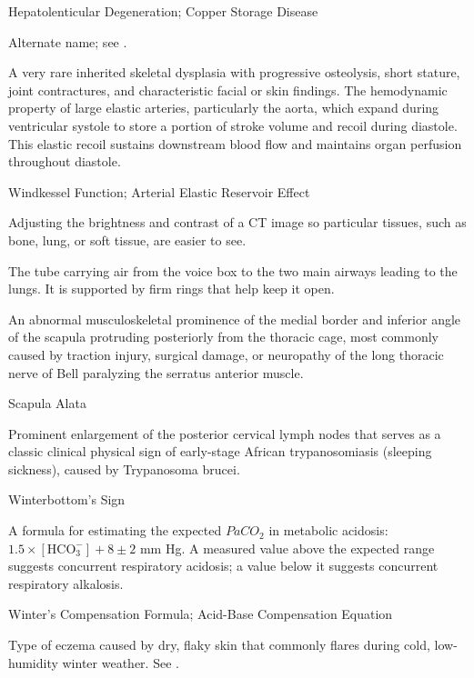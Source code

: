 \synonyms
Hepatolenticular Degeneration; Copper Storage Disease

 Alternate name; see .

 A very rare inherited skeletal dysplasia with progressive osteolysis, short stature, joint contractures, and characteristic facial or skin findings.
 The hemodynamic property of large elastic arteries, particularly the aorta, which expand during ventricular systole to store a portion of stroke volume and recoil during diastole. This elastic recoil sustains downstream blood flow and maintains organ perfusion throughout diastole.

\synonyms
Windkessel Function; Arterial Elastic Reservoir Effect

 Adjusting the brightness and contrast of a CT image so particular tissues, such as bone, lung, or soft tissue, are easier to see.

 The tube carrying air from the voice box to the two main airways leading to the lungs. It is supported by firm rings that help keep it open.

 An abnormal musculoskeletal prominence of the medial border and inferior angle of the scapula protruding posteriorly from the thoracic cage, most commonly caused by traction injury, surgical damage, or neuropathy of the long thoracic nerve of Bell paralyzing the serratus anterior muscle.

\synonyms
Scapula Alata

 Prominent enlargement of the posterior cervical lymph nodes that serves as a classic clinical physical sign of early-stage African trypanosomiasis (sleeping sickness), caused by Trypanosoma brucei.

\synonyms
Winterbottom's Sign

 A formula for estimating the expected $PaCO_2$ in metabolic acidosis: $1.5 \times [\text{HCO}_3^-] + 8 \pm 2$ mm Hg. A measured value above the expected range suggests concurrent respiratory acidosis; a value below it suggests concurrent respiratory alkalosis.

\synonyms
Winter's Compensation Formula; Acid-Base Compensation Equation

 Type of eczema caused by dry, flaky skin that commonly flares during cold, low-humidity winter weather. See .

